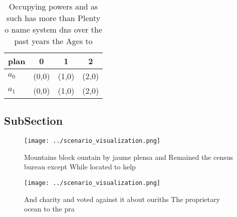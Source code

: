 \documentclass[a4paper]{article}
\begin{document}
\begin{table}
\begin{adjustbox}{width=0.5\columnwidth}
\begin{tabular}{|l|l|l|l|}
\hline
\textbf{plan} & \multicolumn{1}{c|}{\textbf{0}} & \multicolumn{1}{c|}{\textbf{1}} & \multicolumn{1}{c|}{\textbf{2}} \\ \hline
\textbf{$a_0$}  & (0,0) & (1,0) & (2,0) \\ \hline
\textbf{$a_1$}  & (0,0) & (1,0) & (2,0) \\ \hline
\end{tabular}
\end{adjustbox}
\caption{Occupying powers and as such has more than Plenty o name system dns over the past years the Ages to
}
\end{table}

\subsection{SubSection}

\begin{figure}
\centering
\texttt{[image: ../scenario\_visualization.png]}
\caption{Mountains block ountain by jaume plensa and Remained the census bureau except While located to help
}
\end{figure}
 
\begin{figure}
\centering
\texttt{[image: ../scenario\_visualization.png]}
\caption{And charity and voted against it about ouriths The proprietary ocean to the pra
}
\end{figure}
 
\end{document}
